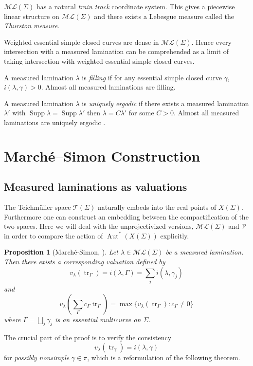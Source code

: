 \documentclass[11pt]{amsart}
\numberwithin{theorem}{section}
\newtheorem{proposition}[theorem]{Proposition}
\theoremstyle{definition}
\theoremstyle{remark}
\newcommand{\Tcal}{{\mathcal{T}}}
\newcommand{\Vcal}{{\mathcal{V}}}
\DeclareMathOperator{\Aut}{Aut}
\DeclareMathOperator{\Supp}{Supp}
\DeclareMathOperator{\tr}{tr}
\newcommand{\<}{\langle}
\renewcommand{\>}{\rangle}
\begin{document}
$\mathcal{ML}(\Sigma)$ has a natural \textit{train track} coordinate system. This gives a piecewise linear structure on $\mathcal{ML}(\Sigma)$ and there exists a Lebesgue measure called the \textit{Thurston measure}. 

Weighted essential simple closed curves are dense in $\mathcal{ML}(\Sigma)$. Hence every intersection with a measured lamination can be comprehended as a limit of taking intersection with weighted essential simple closed curves.

A measured lamination $\lambda$ is \textit{filling} if for any essential simple closed curve $\gamma$, $i(\lambda, \gamma) > 0$. Almost all measured laminations are filling.

A measured lamination $\lambda$ is \textit{uniquely ergodic} if there exists a measured lamination $\lambda'$ with $\Supp \lambda = \Supp \lambda'$ then $\lambda = C \lambda'$ for some $C > 0$. Almost all measured laminations are uniquely ergodic \cite{masur1982interval}.

\section{March\'e--Simon Construction}\label{section3}

\subsection{Measured laminations as valuations}

The Teichm\"uller space $\Tcal(\Sigma)$ naturally embeds into the real points of $X(\Sigma)$. Furthermore one can construct an embedding between the compactification of the two spaces. Here we will deal with the unprojectivized versions, $\mathcal{ML}(\Sigma)$ and $\Vcal$ in order to compare the action of $\Aut^*(X(\Sigma))$ explicitly.

\begin{proposition}[March\'e-Simon, \cite{marche2021automorphisms}]
    Let $\lambda \in \mathcal{ML}(\Sigma)$ be a measured lamination. Then there exists a corresponding valuation defined by
    \[
    v_{\lambda}(\tr_{\Gamma}) = i(\lambda, \Gamma) = \sum_j i(\lambda, \gamma_j)
    \]
    and
    \[
    v_\lambda\left(\sum_{\Gamma} c_{\Gamma} \tr_{\Gamma}\right) = \max \{ v_\lambda(\tr_{\Gamma}) : c_{\Gamma} \neq 0 \}
    \]
    where $\Gamma = \bigsqcup_j \gamma_j$ is an essential multicurve on $\Sigma$.
\end{proposition}

The crucial part of the proof is to verify the consistency
\[
v_{\lambda}(\tr_\gamma) = i(\lambda, \gamma)
\]
for \textit{possibly nonsimple} $\gamma \in \pi$, which is a reformulation of the following theorem.
\end{document}
